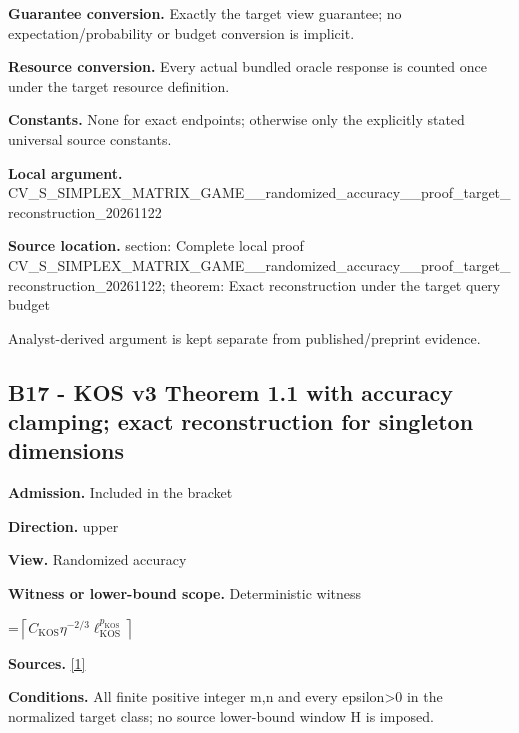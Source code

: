\documentclass[10pt,a4paper]{article}
\newcommand{\AtlasMath}[1]{\par\begingroup\centering\setbox0=\hbox{$\displaystyle #1$}\ifdim\wd0>1.4\linewidth\typeout{ATLAS WIDE FORMULA: \the\wd0}\fi\ifdim\wd0>\linewidth\resizebox{\linewidth}{!}{\box0}\else\box0\fi\par\endgroup}
\begin{document}
\textbf{Guarantee conversion.} Exactly the target view guarantee; no expectation/probability or budget conversion is implicit.



\textbf{Resource conversion.} Every actual bundled oracle response is counted once under the target resource definition.



\textbf{Constants.} None for exact endpoints; otherwise only the explicitly stated universal source constants.



\textbf{Local argument.} CV\_S\_SIMPLEX\_MATRIX\_GAME\allowbreak{}\_\_randomized\_accuracy\_\_p\allowbreak{}roof\_target\_reconstructi\allowbreak{}on\_20261122



\textbf{Source location.}  section: Complete local proof CV\_S\_SIMPLEX\_MATRIX\_GAME\allowbreak{}\_\_randomized\_accuracy\_\_p\allowbreak{}roof\_target\_reconstructi\allowbreak{}on\_20261122; theorem: Exact reconstruction under the target query budget



Analyst-derived argument is kept separate from published/preprint evidence.



\subsection{B17 - KOS v3 Theorem 1.1 with accuracy clamping; exact reconstruction for singleton dimensions}


\textbf{Admission.} Included in the bracket



\textbf{Direction.} upper



\textbf{View.} Randomized accuracy



\textbf{Witness or lower-bound scope.} Deterministic witness



\AtlasMath{\left\lceil C_{\mathrm{KOS}}\eta^{-2/3}\ell_{\mathrm{KOS}}^{p_{\mathrm{KOS}}}\right\rceil}


\textbf{Sources.} \href{https://arxiv.org/pdf/2601.02347v3}{[1]}



\textbf{Conditions.} All finite positive integer m,n and every epsilon>0 in the normalized target class; no source lower-bound window H is imposed.
\end{document}
